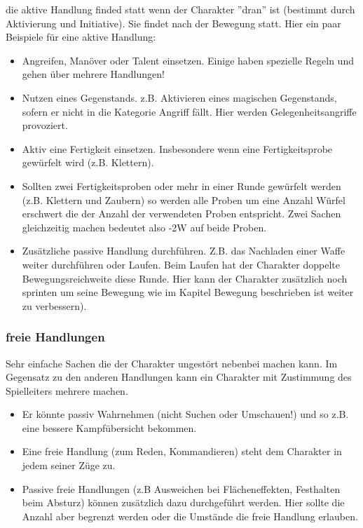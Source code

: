 \documentclass{article}
\begin{document}
die aktive Handlung finded statt wenn der Charakter ''dran'' ist (bestimmt durch Aktivierung und Initiative). Sie
findet nach der Bewegung statt. Hier ein paar Beispiele für eine aktive Handlung:

\begin{itemize}
\item Angreifen, Manöver oder Talent einsetzen. Einige haben spezielle Regeln und gehen über mehrere Handlungen!
\item Nutzen eines Gegenstands. z.B. Aktivieren eines magischen Gegenstands, sofern er nicht in die Kategorie Angriff fällt. Hier werden Gelegenheitsangriffe provoziert.
\item Aktiv eine Fertigkeit einsetzen. Insbesondere wenn eine Fertigkeitsprobe gewürfelt wird (z.B. Klettern).
\item Sollten zwei Fertigkeitsproben oder mehr in einer Runde gewürfelt werden (z.B. Klettern und Zaubern) so werden alle Proben um eine Anzahl Würfel erschwert die der Anzahl der verwendeten Proben entspricht. Zwei Sachen gleichzeitig machen bedeutet also -2W auf beide Proben.
\item Zusätzliche passive Handlung durchführen. Z.B. das Nachladen einer Waffe weiter durchführen oder Laufen. Beim Laufen hat der Charakter doppelte Bewegungsreichweite diese Runde. Hier kann der Charakter zusätzlich noch sprinten um seine Bewegung wie im Kapitel Bewegung beschrieben ist weiter zu verbessern).
\end{itemize}

\subsubsection{freie Handlungen}

Sehr einfache Sachen die der Charakter ungestört nebenbei machen kann. Im Gegensatz zu den anderen Handlungen kann
ein Charakter mit Zustimmung des Spielleiters mehrere machen.

\begin{itemize}
\item Er könnte passiv Wahrnehmen (nicht Suchen oder Umschauen!) und so z.B. eine bessere Kampfübersicht bekommen.
\item Eine freie Handlung (zum Reden, Kommandieren) steht dem Charakter in jedem seiner Züge zu.
\item Passive freie Handlungen (z.B Ausweichen bei Flächeneffekten, Festhalten beim Absturz) können zusätzlich dazu durchgeführt werden. Hier sollte die Anzahl aber begrenzt werden oder die Umstände die freie Handlung erlauben.
\end{itemize}
\end{document}
